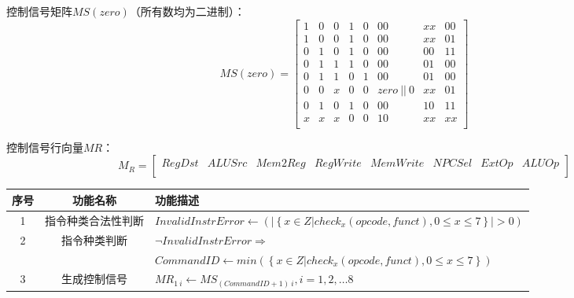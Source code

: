 \documentclass[main.tex]{subfiles}
\begin{document}
控制信号矩阵$MS(zero)$（所有数均为二进制）：
$$
MS(zero) = 
\left[
\begin{array}{cccccccc}
    1 & 0 & 0 & 1 & 0 & 00 & xx & 00 \\
    1 & 0 & 0 & 1 & 0 & 00 & xx & 01 \\
    0 & 1 & 0 & 1 & 0 & 00 & 00 & 11 \\
    0 & 1 & 1 & 1 & 0 & 00 & 01 & 00 \\
    0 & 1 & 1 & 0 & 1 & 00 & 01 & 00 \\
    0 & 0 & x & 0 & 0 & zero\ ||\ 0 & xx & 01 \\
    0 & 1 & 0 & 1 & 0 & 00 & 10 & 11 \\
    x & x & x & 0 & 0 & 10 & xx & xx \\
\end{array}
\right]
$$

控制信号行向量$MR$：
$$
M_R =
\left[
\begin{array}{cccccccc}
    RegDst & ALUSrc & Mem2Reg & RegWrite & MemWrite & NPCSel &ExtOp & ALUOp \\
\end{array}
\right]
$$

\begin{center}
    \begin{tabular}{c c l}
        \toprule
        序号 & 功能名称 & 功能描述 \\
        \midrule
        1 & 指令种类合法性判断 & $ InvalidInstrError \leftarrow \left( |\left\{x\in Z | check_x(opcode, funct), 0\leq x \leq 7\right\}| > 0 \right)$ \\
        2 & 指令种类判断 & $\neg InvalidInstrError \Rightarrow$ \\
         & & $CommandID \leftarrow min\left(\left\{ x\in Z | check_x(opcode, funct), 0\leq x \leq 7\right\}\right) $ \\
        3 & 生成控制信号 & $ MR_{1 \  i} \leftarrow MS_{(CommandID+1) \ i}, i = 1, 2, \dots 8$ \\
        \bottomrule
    \end{tabular}
\end{center}
\end{document}
